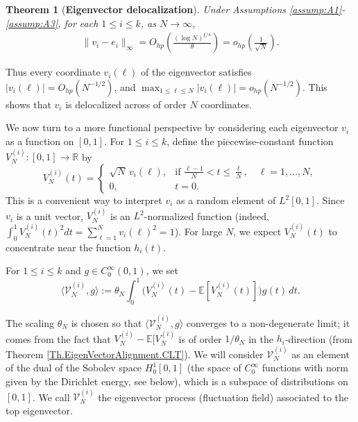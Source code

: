 \documentclass[11pt, reqno]{amsart}
\numberwithin{equation}{section}
\newtheorem{theorem}{Theorem}[section]
\newcommand{\E}{\mbox{${\mathbb E}$}}
\begin{document}
\begin{theorem}[{\bf Eigenvector delocalization}]\label{Decolalization}  Under Assumptions \ref{assump:A1}-\ref{assump:A3}, for each $1\le i\le k$, as $N\to\infty$,
\begin{align*}
\|v_i - e_i\|_{\infty} = O_{hp}\left(\frac{(\log N)^{\xi/4}}{\theta}\right) = o_{hp}\left(\frac{1}{\sqrt{N}}\right).
\end{align*}
\end{theorem}

Thus every coordinate $v_i(\ell)$ of the eigenvector satisfies $|v_i(\ell)| = O_{hp}(N^{-1/2})$, and $\max_{1\le \ell\le N}|v_i(\ell)| = o_{hp}(N^{-1/2})$. This shows that $v_i$ is delocalized across of order $N$ coordinates.


We now turn to a more functional perspective by considering each eigenvector $v_i$ as a
function on $[0,1]$. For $1 \le i \le k$, define the piecewise-constant function
$V_N^{(i)} : [0,1] \to \mathbb{R}$ by
\begin{equation}\label{eq:Processfn}
  V_N^{(i)}(t) =
  \begin{cases}
    \sqrt{N}\, v_i(\ell), & \text{if } \frac{\ell-1}{N} < t \le \frac{\ell}{N},\quad \ell = 1,\dots,N,\\[1ex]
    0, & t = 0.
  \end{cases}
\end{equation}
 This is a convenient way to interpret $v_i$ as a random element of $L^2[0,1]$. Since $v_i$ is a unit vector, $V_N^{(i)}$ is an $L^2$-normalized function (indeed, $\int_0^1 V_N^{(i)}(t)^2 dt = \sum_{\ell=1}^N v_i(\ell)^2=1$).  For large $N$, we expect $V_N^{(i)}(t)$ to concentrate near the function $h_i(t)$.


For $1 \le i \le k$ and $g \in C_0^\infty(0,1)$, we set
\begin{equation}\label{EVecproAction}
  \langle \mathcal V_N^{(i)}, g\rangle
  := \theta_N \int_0^1 \big( V_N^{(i)}(t) - \mathbb{E}[V_N^{(i)}(t)] \big) g(t)\,dt.
\end{equation}

 The scaling $\theta_N $ is chosen so that $\langle \mathcal V_N^{(i)}, g \rangle$ converges to a non-degenerate limit; it comes from the fact that $V_N^{(i)} - \E[V_N^{(i)}$ is of order $1/\theta_N$ in the $h_i$-direction (from Theorem \ref{Th.EigenVectorAlignment.CLT}). We will consider $\mathcal V_N^{(i)}$ as an element of the dual of the Sobolev space $H^1_0[0,1]$ (the space of $C_0^\infty$ functions with norm given by the Dirichlet energy, see below), which is a subspace of distributions on $[0,1]$. We call $\mathcal V_N^{(i)}$ the eigenvector process (fluctuation field) associated to the top eigenvector.
\end{document}
